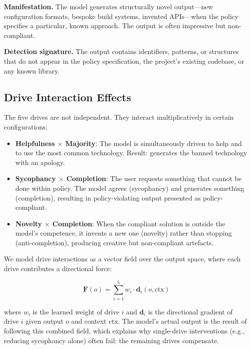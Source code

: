 \documentclass[11pt,a4paper]{article}
\begin{document}
\textbf{Manifestation.}  The model generates structurally novel
output---new configuration formats, bespoke build systems,
invented APIs---when the policy specifies a particular, known
approach.  The output is often impressive but non-compliant.

\textbf{Detection signature.}  The output contains identifiers,
patterns, or structures that do not appear in the policy specification,
the project's existing codebase, or any known library.

\subsection{Drive Interaction Effects}
\label{sec:drive-interactions}

The five drives are not independent.  They interact multiplicatively
in certain configurations:

\begin{itemize}
  \item \textbf{Helpfulness $\times$ Majority}: The model is
        simultaneously driven to help and to use the most common
        technology.  Result: generates the banned technology with
        an apology.
  \item \textbf{Sycophancy $\times$ Completion}: The user requests
        something that cannot be done within policy.  The model
        agrees (sycophancy) and generates something (completion),
        resulting in policy-violating output presented as
        policy-compliant.
  \item \textbf{Novelty $\times$ Completion}: When the compliant
        solution is outside the model's competence, it invents
        a new one (novelty) rather than stopping (anti-completion),
        producing creative but non-compliant artefacts.
\end{itemize}

We model drive interactions as a vector field over the output space,
where each drive contributes a directional force:

\begin{equation}
  \label{eq:drive-field}
  \mathbf{F}(o) = \sum_{i=1}^{5} w_i \cdot \mathbf{d}_i(o, \text{ctx})
\end{equation}

where $w_i$ is the learned weight of drive $i$ and $\mathbf{d}_i$
is the directional gradient of drive $i$ given output $o$ and
context $\text{ctx}$.  The model's actual output is the result of
following this combined field, which explains why single-drive
interventions (e.g., reducing sycophancy alone) often fail: the
remaining drives compensate.
\end{document}
